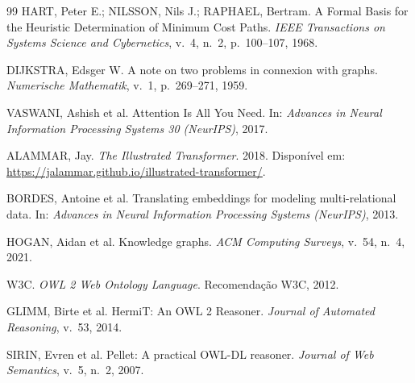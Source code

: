 \documentclass[12pt, a4paper]{article}
\begin{document}
\begin{thebibliography}{99}
HART, Peter E.; NILSSON, Nils J.; RAPHAEL, Bertram. A Formal Basis for the Heuristic Determination of Minimum Cost Paths. \textit{IEEE Transactions on Systems Science and Cybernetics}, v.~4, n.~2, p.~100--107, 1968.

DIJKSTRA, Edsger W. A note on two problems in connexion with graphs. \textit{Numerische Mathematik}, v.~1, p.~269--271, 1959.

VASWANI, Ashish et al. Attention Is All You Need. In: \textit{Advances in Neural Information Processing Systems 30 (NeurIPS)}, 2017.

ALAMMAR, Jay. \textit{The Illustrated Transformer}. 2018. Disponível em: \url{https://jalammar.github.io/illustrated-transformer/}.

BORDES, Antoine et al. Translating embeddings for modeling multi-relational data. In: \textit{Advances in Neural Information Processing Systems (NeurIPS)}, 2013.

HOGAN, Aidan et al. Knowledge graphs. \textit{ACM Computing Surveys}, v.~54, n.~4, 2021.

W3C. \textit{OWL 2 Web Ontology Language}. Recomendação W3C, 2012.

GLIMM, Birte et al. HermiT: An OWL 2 Reasoner. \textit{Journal of Automated Reasoning}, v.~53, 2014.

SIRIN, Evren et al. Pellet: A practical OWL-DL reasoner. \textit{Journal of Web Semantics}, v.~5, n.~2, 2007.
\end{thebibliography}
\end{document}
